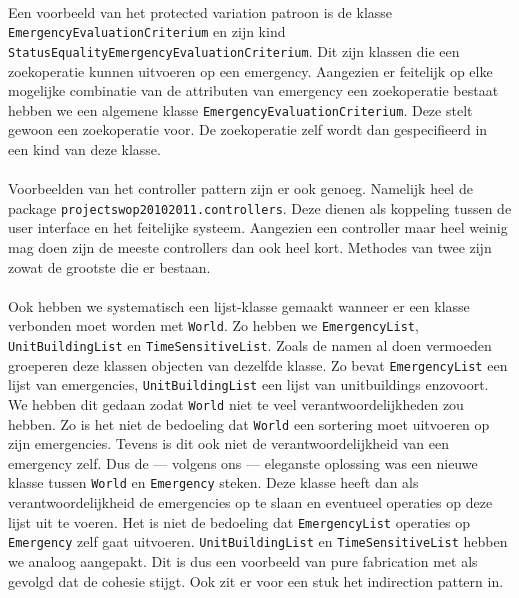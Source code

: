\paragraph{} Een voorbeeld van het protected variation patroon is de klasse \verb+EmergencyEvaluationCriterium+ en zijn kind \verb+StatusEqualityEmergencyEvaluationCriterium+. Dit zijn klassen die een zoekoperatie kunnen uitvoeren op een emergency. Aangezien er feitelijk op elke mogelijke combinatie van de attributen van emergency een zoekoperatie bestaat hebben we een algemene klasse \verb+EmergencyEvaluationCriterium+. Deze stelt gewoon een zoekoperatie voor. De zoekoperatie zelf wordt dan gespecifieerd in een kind van deze klasse.
\paragraph{}
Voorbeelden van het controller pattern zijn er ook genoeg. Namelijk heel de package \verb+projectswop20102011.controllers+. Deze dienen als koppeling tussen de user interface en het feitelijke systeem. Aangezien een controller maar heel weinig mag doen zijn de meeste controllers dan ook heel kort. Methodes van twee zijn zowat de grootste die er bestaan.
\paragraph{}
Ook hebben we systematisch een lijst-klasse gemaakt wanneer er een klasse verbonden moet worden met \verb+World+. Zo hebben we \verb+EmergencyList+, \verb+UnitBuildingList+ en \verb+TimeSensitiveList+. Zoals de namen al doen vermoeden groeperen deze klassen objecten van dezelfde klasse. Zo bevat \verb+EmergencyList+ een lijst van emergencies, \verb+UnitBuildingList+ een lijst van unitbuildings enzovoort. We hebben dit gedaan zodat \verb+World+ niet te veel verantwoordelijkheden zou hebben. Zo is het niet de bedoeling dat \verb+World+ een sortering moet uitvoeren op zijn emergencies. Tevens is dit ook niet de verantwoordelijkheid van een emergency zelf. Dus de --- volgens ons --- eleganste oplossing was een nieuwe klasse tussen \verb+World+ en \verb+Emergency+ steken. Deze klasse heeft dan als verantwoordelijkheid de emergencies op te slaan en eventueel operaties op deze lijst uit te voeren. Het is niet de bedoeling dat \verb+EmergencyList+ operaties op \verb+Emergency+ zelf gaat uitvoeren. \verb+UnitBuildingList+ en \verb+TimeSensitiveList+ hebben we analoog aangepakt. Dit is dus een voorbeeld van pure fabrication met als gevolgd dat de cohesie stijgt. Ook zit er voor een stuk het indirection pattern in.
